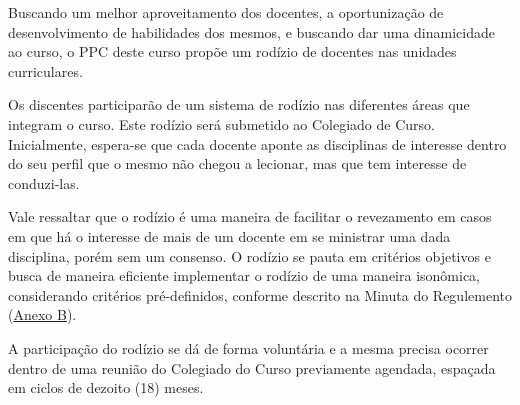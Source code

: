 \documentclass[
	12pt,				%
	openright,			%
	twoside,			%
	a4paper,			%
	chapter=TITLE,		%
	english,			%
	french,				%
	spanish,			%
	brazil,				%
	]{abntex2}
\begin{document}
Buscando um melhor aproveitamento dos docentes, a oportunização de desenvolvimento de habilidades dos mesmos, e buscando dar uma dinamicidade ao curso, o PPC deste curso propõe um rodízio de docentes nas unidades curriculares.

Os discentes participarão de um sistema de rodízio nas diferentes áreas que integram o curso. Este rodízio  será  submetido ao Colegiado de Curso.  Inicialmente, espera-se que cada docente aponte as disciplinas de interesse dentro do seu perfil que o mesmo não chegou a lecionar, mas que tem interesse de conduzi-las. 

Vale ressaltar que o rodízio é uma maneira de facilitar o revezamento em casos em que há o interesse de mais de um docente em se ministrar uma dada disciplina, porém sem um consenso. O rodízio se pauta em critérios objetivos e busca de maneira eficiente implementar o rodízio de uma maneira isonômica, considerando critérios pré-definidos, conforme descrito na Minuta do Regulemento  (\hyperref[anexo:rodizio]{Anexo B}).

A participação do rodízio se dá de forma voluntária e a mesma precisa ocorrer dentro de uma reunião do Colegiado do Curso previamente agendada, espaçada em ciclos de dezoito (18) meses. 
\end{document}
